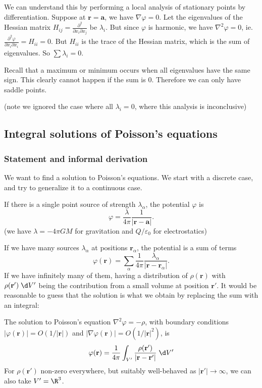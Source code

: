 \documentclass[a4paper]{article}
\begin{document}
We can understand this by performing a local analysis of stationary points by differentiation. Suppose at $\mathbf{r} = \mathbf{a}$, we have $\nabla\varphi = 0$. Let the eigenvalues of the Hessian matrix $H_{ij} = \frac{\partial^2}{\partial x_i \partial x_j}$ be $\lambda_i$. But since $\varphi$ is harmonic, we have $\nabla^2 \varphi = 0$, ie. $\frac{\partial^2\varphi}{\partial x_i\partial x_i} = H_{ii} = 0$. But $H_{ii}$ is the trace of the Hessian matrix, which is the sum of eigenvalues. So $\sum \lambda_i = 0$.

Recall that a maximum or minimum occurs when all eigenvalues have the same sign. This clearly cannot happen if the sum is 0. Therefore we can only have saddle points.

(note we ignored the case where all $\lambda_i = 0$, where this analysis is inconclusive)
\subsection{Integral solutions of Poisson's equations}
\subsubsection{Statement and informal derivation}
We want to find a solution to Poisson's equations. We start with a discrete case, and try to generalize it to a continuous case.

If there is a single point source of strength $\lambda_\alpha$, the potential $\varphi$ is
\[
  \varphi = \frac{\lambda}{4\pi} \frac{1}{|\mathbf{r} - \mathbf{a}|}.
\]
(we have $\lambda = -4\pi GM$ for gravitation and $Q/\varepsilon_0$ for electrostatics)

If we have many sources $\lambda_\alpha$ at positions $\mathbf{r}_\alpha$, the potential is a sum of terms
\[
  \varphi(\mathbf{r}) = \sum_{\alpha} \frac{1}{4\pi}\frac{\lambda_\alpha}{|\mathbf{r} - \mathbf{r}_\alpha|}.
\]
If we have infinitely many of them, having a distribution of $\rho(\mathbf{r})$ with $\rho(\mathbf{r}')\;\d V'$ being the contribution from a small volume at position $\mathbf{r}'$. It would be reasonable to guess that the solution is what we obtain by replacing the sum with an integral:

\begin{prop}
  The solution to Poisson's equation $\nabla^2 \varphi = -\rho$, with boundary conditions $|\varphi (\mathbf{r})| = O(1/|\mathbf{r}|)$ and $|\nabla\varphi(\mathbf{r})| = O(1/|\mathbf{r}|^2)$, is
  \[
    \varphi(\mathbf{r}) = \frac{1}{4\pi}\int_{V'} \frac{\rho(\mathbf{r}')}{|\mathbf{r} - \mathbf{r}'|}\;\d V'
  \]
  For $\rho(\mathbf{r}')$ non-zero everywhere, but suitably well-behaved as $|\mathbf{r}'| \to \infty$, we can also take $V' = \R^3$.
\end{prop}
\end{document}

